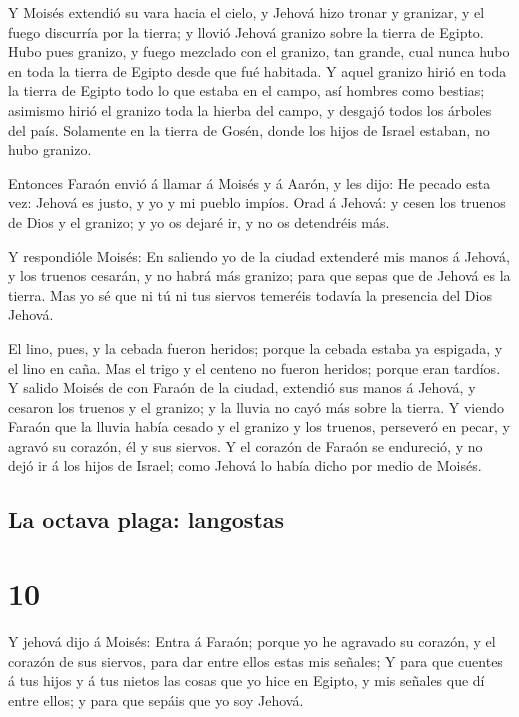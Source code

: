  Y Moisés extendió su vara hacia el cielo, y Jehová hizo
tronar y granizar, y el fuego discurría por la tierra; y llovió Jehová
granizo sobre la tierra de Egipto.  Hubo pues granizo, y
fuego mezclado con el granizo, tan grande, cual nunca hubo en toda la
tierra de Egipto desde que fué habitada.  Y aquel granizo
hirió en toda la tierra de Egipto todo lo que estaba en el campo, así
hombres como bestias; asimismo hirió el granizo toda la hierba del
campo, y desgajó todos los árboles del país.  Solamente en
la tierra de Gosén, donde los hijos de Israel estaban, no hubo granizo.

 Entonces Faraón envió á llamar á Moisés y á Aarón, y les
dijo: He pecado esta vez: Jehová es justo, y yo y mi pueblo impíos.
 Orad á Jehová: y cesen los truenos de Dios y el granizo; y
yo os dejaré ir, y no os detendréis más.

 Y respondióle Moisés: En saliendo yo de la ciudad
extenderé mis manos á Jehová, y los truenos cesarán, y no habrá más
granizo; para que sepas que de Jehová es la tierra.  Mas yo
sé que ni tú ni tus siervos temeréis todavía la presencia del Dios
Jehová.

 El lino, pues, y la cebada fueron heridos; porque la
cebada estaba ya espigada, y el lino en caña.  Mas el trigo
y el centeno no fueron heridos; porque eran tardíos.  Y
salido Moisés de con Faraón de la ciudad, extendió sus manos á Jehová, y
cesaron los truenos y el granizo; y la lluvia no cayó más sobre la
tierra.  Y viendo Faraón que la lluvia había cesado y el
granizo y los truenos, perseveró en pecar, y agravó su corazón, él y sus
siervos.  Y el corazón de Faraón se endureció, y no dejó ir
á los hijos de Israel; como Jehová lo había dicho por medio de Moisés.

\hypertarget{la-octava-plaga-langostas}{%
\subsection{La octava plaga:
langostas}\label{la-octava-plaga-langostas}}

\hypertarget{section-9}{%
\section{10}\label{section-9}}

 Y jehová dijo á Moisés: Entra á Faraón; porque yo he
agravado su corazón, y el corazón de sus siervos, para dar entre ellos
estas mis señales;  Y para que cuentes á tus hijos y á tus
nietos las cosas que yo hice en Egipto, y mis señales que dí entre
ellos; y para que sepáis que yo soy Jehová.

